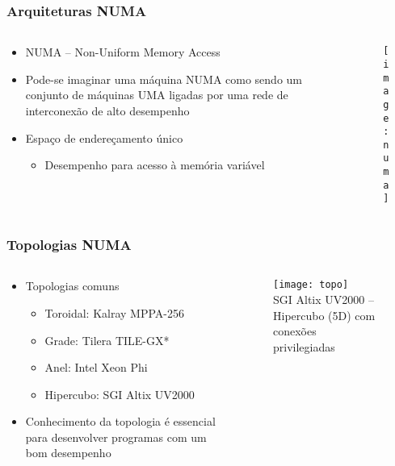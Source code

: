 \documentclass[Ligatures=TeX,table,brazil,svgnames,usetotalslideindicator,compress,10pt]{beamer}
\begin{document}
\begin{frame}
  \frametitle{Arquiteturas NUMA}

  \begin{columns}
    \begin{column}{0.5\textwidth}
      \begin{itemize}
      \item \alert{NUMA – Non-Uniform Memory Access}
      \item Pode-se imaginar uma máquina NUMA como sendo um conjunto de máquinas UMA ligadas por uma rede de interconexão de alto desempenho
      \item \alert{Espaço de endereçamento único}
        \begin{itemize}
        \item \alert{Desempenho} para acesso à memória \alert{variável}
        \end{itemize}

      \end{itemize}
    \end{column}
    \begin{column}{0.5\textwidth}
      \begin{figure}
        \centering
        \texttt{[image: numa]}
      \end{figure}
     \end{column}
  \end{columns}
\end{frame}

\begin{frame}
  \frametitle{Topologias NUMA}

  \begin{columns}
    \begin{column}{0.5\textwidth}
      \begin{itemize}
      \item Topologias comuns
        \begin{itemize}
        \item \alert{Toroidal}: Kalray MPPA-256
        \item \alert{Grade}: Tilera TILE-GX*
        \item \alert{Anel}: Intel Xeon Phi
        \item \alert{Hipercubo}: SGI Altix UV2000
        \end{itemize}
      \item \alert{Conhecimento da topologia é essencial} para desenvolver programas com um \alert{bom desempenho}
      \end{itemize}
    \end{column}
    \begin{column}{0.5\textwidth}
      \begin{figure}
        \centering
        \texttt{[image: topo]} \\
        \footnotesize{SGI Altix UV2000 – Hipercubo (5D) com conexões privilegiadas}
      \end{figure}
     \end{column}
  \end{columns}
\end{frame}
\end{document}
